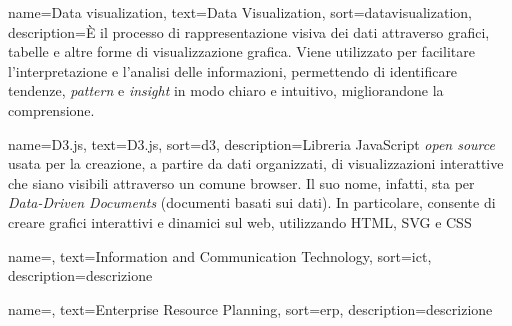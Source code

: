 







    
 {
    name=Data visualization,
    text=Data Visualization,
    sort=datavisualization,
    description={È il processo di rappresentazione visiva dei dati attraverso grafici, tabelle e altre forme di visualizzazione grafica.
    Viene utilizzato per facilitare l'interpretazione e l'analisi delle informazioni, permettendo di identificare tendenze, \emph{pattern} e \emph{insight} 
    in modo chiaro e intuitivo, migliorandone la comprensione.}
}

 {
    name=D3.js,
    text=D3.js,
    sort=d3,
    description={Libreria JavaScript \emph{open source} usata per la creazione, a partire da dati organizzati, di visualizzazioni interattive che siano visibili attraverso un comune browser.
    Il suo nome, infatti, sta per \emph{Data-Driven Documents} (documenti basati sui dati). 
    In particolare, consente di creare grafici interattivi e dinamici sul web, utilizzando HTML, SVG e CSS}
}

 {
    name=,
    text=Information and Communication Technology,
    sort=ict,
    description={descrizione}
}

 {
    name=,
    text=Enterprise Resource Planning,
    sort=erp,
    description={descrizione}
}

